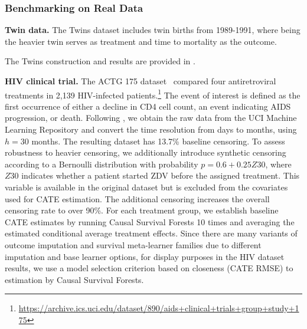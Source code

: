 \subsubsection{Benchmarking on Real Data}
\label{ch04:sec:real-data}

\textbf{Twin data.} The Twins dataset \citep{almond2005the,curth2021survite} includes twin births from 1989-1991, where being the heavier twin serves as treatment and time to mortality as the outcome.


The Twins construction and results are provided in \citet[Section 4.3 and Appendix H.1, Figures 3 and 21]{noroozizadeh2026survhte}.

\textbf{HIV clinical trial.} The ACTG 175 dataset~\citep{hammer1996atrial} compared four antiretroviral treatments in 2,139 HIV-infected patients.\footnote{\url{https://archive.ics.uci.edu/dataset/890/aids+clinical+trials+group+study+175}}
The event of interest is defined as the first occurrence of either a decline in CD4 cell count, an event indicating AIDS progression, or death.
Following \citet{meir2025heterogeneous}, we obtain the raw data from the UCI Machine Learning Repository and convert the time resolution from days to months, using $h=30$ months. 
The resulting dataset has 13.7\% baseline censoring. 
To assess robustness to heavier censoring, we additionally introduce synthetic censoring according to a Bernoulli distribution with probability $p=0.6+0.25Z30$, where $Z30$ indicates whether a patient started ZDV before the assigned treatment. 
This variable is available in the original dataset but is excluded from the covariates used for CATE estimation. 
The additional censoring increases the overall censoring rate to over 90\%.
For each treatment group, we establish baseline CATE estimates by running Causal Survival Forests 10 times and averaging the estimated conditional average treatment effects.
Since there are many variants of outcome imputation and survival meta-learner families due to different imputation and base learner options, for display purposes in the HIV dataset results, we use a model selection criterion based on closeness (CATE RMSE) to estimation by Causal Survival Forests.

